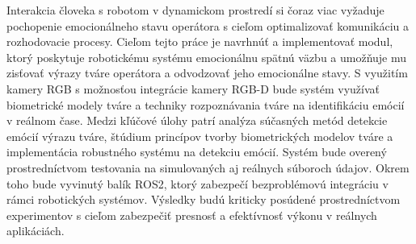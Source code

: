 Interakcia človeka s robotom v dynamickom prostredí si čoraz viac vyžaduje pochopenie emocionálneho stavu operátora s cieľom optimalizovať komunikáciu a rozhodovacie procesy. Cieľom tejto práce je navrhnúť a implementovať modul, ktorý poskytuje robotickému systému emocionálnu spätnú väzbu a umožňuje mu zisťovať výrazy tváre operátora a odvodzovať jeho emocionálne stavy. S využitím kamery RGB s možnosťou integrácie kamery RGB-D bude systém využívať biometrické modely tváre a techniky rozpoznávania tváre na identifikáciu emócií v reálnom čase. Medzi kľúčové úlohy patrí analýza súčasných metód detekcie emócií výrazu tváre, štúdium princípov tvorby biometrických modelov tváre a implementácia robustného systému na detekciu emócií. Systém bude overený prostredníctvom testovania na simulovaných aj reálnych súboroch údajov. Okrem toho bude vyvinutý balík ROS2, ktorý zabezpečí bezproblémovú integráciu v rámci robotických systémov. Výsledky budú kriticky posúdené prostredníctvom experimentov s cieľom zabezpečiť presnosť a efektívnosť výkonu v reálnych aplikáciách.